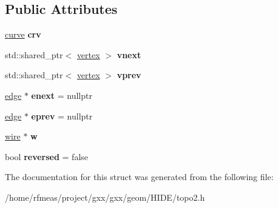 \subsection*{Public Attributes}
\begin{DoxyCompactItemize}
\item 
\hyperlink{classgxx_1_1topo2_1_1curve}{curve} {\bfseries crv}\hypertarget{structgxx_1_1topo2_1_1edge_a77c401efe9714db45ba179ed74abddcc}{}\label{structgxx_1_1topo2_1_1edge_a77c401efe9714db45ba179ed74abddcc}

\item 
std\+::shared\+\_\+ptr$<$ \hyperlink{structgxx_1_1topo2_1_1vertex}{vertex} $>$ {\bfseries vnext}\hypertarget{structgxx_1_1topo2_1_1edge_a301479fb510f622df1ecc0ff91b89cde}{}\label{structgxx_1_1topo2_1_1edge_a301479fb510f622df1ecc0ff91b89cde}

\item 
std\+::shared\+\_\+ptr$<$ \hyperlink{structgxx_1_1topo2_1_1vertex}{vertex} $>$ {\bfseries vprev}\hypertarget{structgxx_1_1topo2_1_1edge_a2e924fff2cba78887ae3818fe713add0}{}\label{structgxx_1_1topo2_1_1edge_a2e924fff2cba78887ae3818fe713add0}

\item 
\hyperlink{structgxx_1_1topo2_1_1edge}{edge} $\ast$ {\bfseries enext} = nullptr\hypertarget{structgxx_1_1topo2_1_1edge_a6d079974057c33da3572c3f11328d765}{}\label{structgxx_1_1topo2_1_1edge_a6d079974057c33da3572c3f11328d765}

\item 
\hyperlink{structgxx_1_1topo2_1_1edge}{edge} $\ast$ {\bfseries eprev} = nullptr\hypertarget{structgxx_1_1topo2_1_1edge_a1cd907a5b82ea61c93e74c2100272968}{}\label{structgxx_1_1topo2_1_1edge_a1cd907a5b82ea61c93e74c2100272968}

\item 
\hyperlink{structgxx_1_1topo2_1_1wire}{wire} $\ast$ {\bfseries w}\hypertarget{structgxx_1_1topo2_1_1edge_ad3c11e5c08484d0682c01dc5cccb9f76}{}\label{structgxx_1_1topo2_1_1edge_ad3c11e5c08484d0682c01dc5cccb9f76}

\item 
bool {\bfseries reversed} = false\hypertarget{structgxx_1_1topo2_1_1edge_a0d9bbc413f7bce82a105d48664b87db4}{}\label{structgxx_1_1topo2_1_1edge_a0d9bbc413f7bce82a105d48664b87db4}

\end{DoxyCompactItemize}


The documentation for this struct was generated from the following file\+:\begin{DoxyCompactItemize}
\item 
/home/rfmeas/project/gxx/gxx/geom/\+H\+I\+D\+E/topo2.\+h\end{DoxyCompactItemize}

